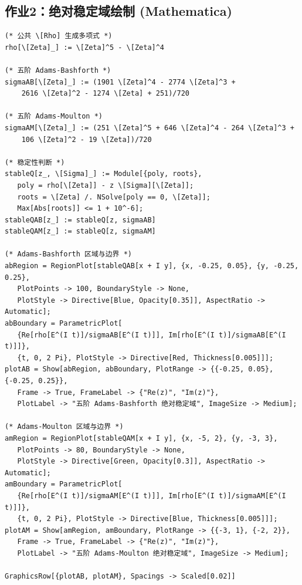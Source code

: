\documentclass[12pt,a4paper]{article}
\begin{document}
\subsection*{作业2：绝对稳定域绘制 (Mathematica)}
\begin{lstlisting}[style=mathstyle, caption={绘制五阶 Adams-Bashforth 与 Adams-Moulton 绝对稳定域}]
(* 公共 \[Rho] 生成多项式 *)
rho[\[Zeta]_] := \[Zeta]^5 - \[Zeta]^4

(* 五阶 Adams-Bashforth *)
sigmaAB[\[Zeta]_] := (1901 \[Zeta]^4 - 2774 \[Zeta]^3 + 
    2616 \[Zeta]^2 - 1274 \[Zeta] + 251)/720

(* 五阶 Adams-Moulton *)
sigmaAM[\[Zeta]_] := (251 \[Zeta]^5 + 646 \[Zeta]^4 - 264 \[Zeta]^3 + 
    106 \[Zeta]^2 - 19 \[Zeta])/720

(* 稳定性判断 *)
stableQ[z_, \[Sigma]_] := Module[{poly, roots},
   poly = rho[\[Zeta]] - z \[Sigma][\[Zeta]];
   roots = \[Zeta] /. NSolve[poly == 0, \[Zeta]];
   Max[Abs[roots]] <= 1 + 10^-6];
stableQAB[z_] := stableQ[z, sigmaAB]
stableQAM[z_] := stableQ[z, sigmaAM]

(* Adams-Bashforth 区域与边界 *)
abRegion = RegionPlot[stableQAB[x + I y], {x, -0.25, 0.05}, {y, -0.25, 0.25},
   PlotPoints -> 100, BoundaryStyle -> None, 
   PlotStyle -> Directive[Blue, Opacity[0.35]], AspectRatio -> Automatic];
abBoundary = ParametricPlot[
   {Re[rho[E^(I t)]/sigmaAB[E^(I t)]], Im[rho[E^(I t)]/sigmaAB[E^(I t)]]},
   {t, 0, 2 Pi}, PlotStyle -> Directive[Red, Thickness[0.005]]];
plotAB = Show[abRegion, abBoundary, PlotRange -> {{-0.25, 0.05}, {-0.25, 0.25}},
   Frame -> True, FrameLabel -> {"Re(z)", "Im(z)"}, 
   PlotLabel -> "五阶 Adams-Bashforth 绝对稳定域", ImageSize -> Medium];

(* Adams-Moulton 区域与边界 *)
amRegion = RegionPlot[stableQAM[x + I y], {x, -5, 2}, {y, -3, 3},
   PlotPoints -> 80, BoundaryStyle -> None, 
   PlotStyle -> Directive[Green, Opacity[0.3]], AspectRatio -> Automatic];
amBoundary = ParametricPlot[
   {Re[rho[E^(I t)]/sigmaAM[E^(I t)]], Im[rho[E^(I t)]/sigmaAM[E^(I t)]]},
   {t, 0, 2 Pi}, PlotStyle -> Directive[Blue, Thickness[0.005]]];
plotAM = Show[amRegion, amBoundary, PlotRange -> {{-3, 1}, {-2, 2}},
   Frame -> True, FrameLabel -> {"Re(z)", "Im(z)"}, 
   PlotLabel -> "五阶 Adams-Moulton 绝对稳定域", ImageSize -> Medium];

GraphicsRow[{plotAB, plotAM}, Spacings -> Scaled[0.02]]
\end{lstlisting}
\end{document}
